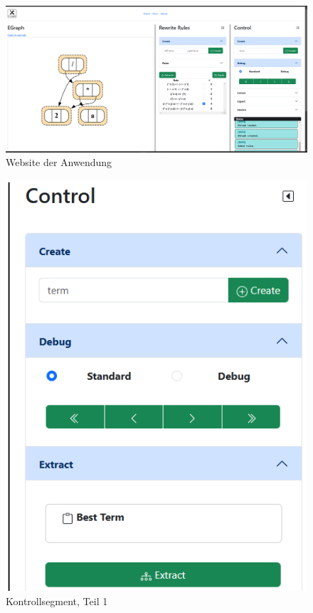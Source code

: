 \newpage
\begin{figure}[H]
\centering
\includegraphics[scale=0.42, angle=90]{../fig/website.png}
\caption{Website der Anwendung}
\label{fig:website}
\end{figure}
\newpage




\begin{figure}
    \begin{center}
      \includegraphics[scale=0.5]{../fig/control1.png}
    \end{center}
    \caption{Kontrollsegment, Teil 1}
    \label{fig:segment31}
\end{figure}

